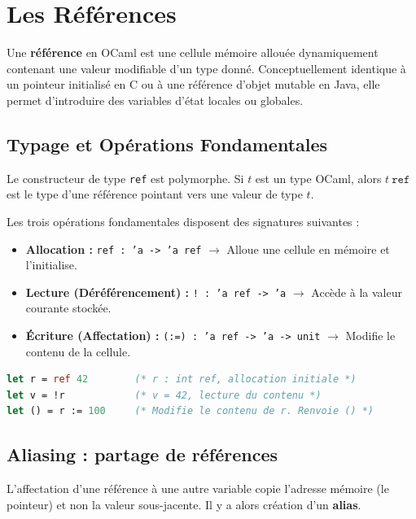 \documentclass{article}
\begin{document}

\section{Les Références}

Une \textbf{référence} en OCaml est une cellule mémoire allouée dynamiquement contenant une valeur modifiable d'un type donné. Conceptuellement identique à un pointeur initialisé en C ou à une référence d'objet mutable en Java, elle permet d'introduire des variables d'état locales ou globales.

\subsection{Typage et Opérations Fondamentales}

Le constructeur de type \texttt{ref} est polymorphe. Si $t$ est un type OCaml, alors $t\ \texttt{ref}$ est le type d'une référence pointant vers une valeur de type $t$.

Les trois opérations fondamentales disposent des signatures suivantes :
\begin{itemize}
    \item \textbf{Allocation :} \texttt{ref : 'a -> 'a ref} $\rightarrow$ Alloue une cellule en mémoire et l'initialise.
    \item \textbf{Lecture (Déréférencement) :} \texttt{! : 'a ref -> 'a} $\rightarrow$ Accède à la valeur courante stockée.
    \item \textbf{Écriture (Affectation) :} \texttt{(:=) : 'a ref -> 'a -> unit} $\rightarrow$ Modifie le contenu de la cellule.
\end{itemize}

\begin{lstlisting}[language=Caml]
let r = ref 42        (* r : int ref, allocation initiale *)
let v = !r            (* v = 42, lecture du contenu *)
let () = r := 100     (* Modifie le contenu de r. Renvoie () *)
\end{lstlisting}

\subsection{Aliasing : partage de références}

L'affectation d'une référence à une autre variable copie l'adresse mémoire (le pointeur) et non la valeur sous-jacente. Il y a alors création d'un \textbf{alias}.
\end{document}
